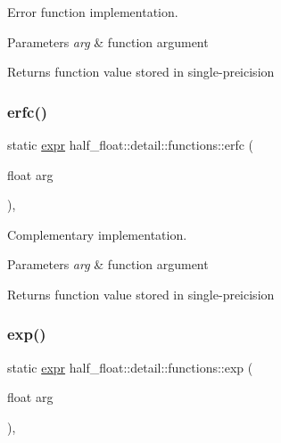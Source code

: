 Error function implementation. 
\begin{DoxyParams}{Parameters}
{\em arg} & function argument \\
\hline
\end{DoxyParams}
\begin{DoxyReturn}{Returns}
function value stored in single-\/preicision 
\end{DoxyReturn}
\mbox{\label{structhalf__float_1_1detail_1_1functions_a874b7a9f50954f082a3928db716943c5}} 
\subsubsection{\texorpdfstring{erfc()}{erfc()}}
{\footnotesize\ttfamily static \hyperlink{structhalf__float_1_1detail_1_1expr}{expr} half\+\_\+float\+::detail\+::functions\+::erfc (\begin{DoxyParamCaption}\item[{float}]{arg }\end{DoxyParamCaption})\hspace{0.3cm}{\ttfamily [inline]}, {\ttfamily [static]}}

Complementary implementation. 
\begin{DoxyParams}{Parameters}
{\em arg} & function argument \\
\hline
\end{DoxyParams}
\begin{DoxyReturn}{Returns}
function value stored in single-\/preicision 
\end{DoxyReturn}
\mbox{\label{structhalf__float_1_1detail_1_1functions_ae615d0479597521f69a3da7ae543c03b}} 
\subsubsection{\texorpdfstring{exp()}{exp()}}
{\footnotesize\ttfamily static \hyperlink{structhalf__float_1_1detail_1_1expr}{expr} half\+\_\+float\+::detail\+::functions\+::exp (\begin{DoxyParamCaption}\item[{float}]{arg }\end{DoxyParamCaption})\hspace{0.3cm}{\ttfamily [inline]}, {\ttfamily [static]}}

